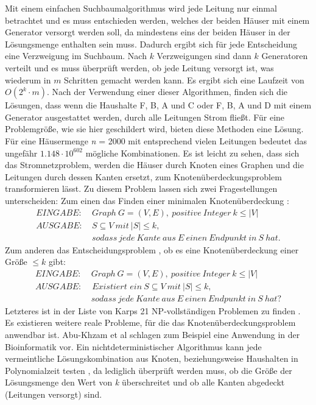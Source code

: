 Mit einem einfachen Suchbaumalgorithmus wird jede Leitung nur einmal betrachtet und es muss entschieden werden, welches der beiden Häuser mit einem Generator versorgt werden soll, da mindestens eins der beiden Häuser in der Lösungsmenge enthalten sein muss. Dadurch ergibt sich für jede Entscheidung eine Verzweigung im Suchbaum. Nach $k$ Verzweigungen sind dann $k$ Generatoren verteilt und es muss überprüft werden, ob jede Leitung versorgt ist, was wiederum in $m$ Schritten gemacht werden kann. Es ergibt sich eine Laufzeit von $O(2^{k} \cdot m)$. 
Nach der Verwendung einer dieser Algorithmen, finden sich die Lösungen, dass wenn die Haushalte F, B, A und C oder F, B, A und D mit einem Generator ausgestattet werden, durch alle Leitungen Strom fließt. Für eine Problemgröße, wie sie hier geschildert wird, bieten diese Methoden eine Lösung. Für eine Häusermenge \emph{n} = 2000 mit entsprechend vielen Leitungen bedeutet das ungefähr $1.148 \cdot 10^{602}$ mögliche Kombinationen.
Es ist leicht zu sehen, dass sich das Stromnetzproblem, werden die Häuser durch Knoten eines Graphen und die Leitungen durch dessen Kanten ersetzt, zum Knotenüberdeckungsproblem transformieren lässt. Zu diesem Problem lassen sich zwei Fragestellungen unterscheiden: Zum einen das Finden einer minimalen Knotenüberdeckung \cite{trees}:
\begin{align*}
EINGABE: &\ Graph\ G=(V,E),\ positive\ Integer\ k\leq |V|\\
AUSGABE: &\ S\subseteq V\ mit\ |S|\leq k,\\
&\ sodass\ jede\ Kante\ aus\ E\ einen\ Endpunkt\ in\ S\ hat.
\end{align*}
Zum anderen das Entscheidungsproblem \cite{exakt}, ob es eine Knotenüberdeckung einer Größe $\leq k$ gibt:
\begin{align*}
EINGABE: &\ Graph\ G=(V,E),\ positive\ Integer\ k\leq |V|\\
AUSGABE: &\textit{ Existiert ein}\ S\subseteq V\ mit\ |S|\leq k,\\
&\ sodass\ jede\ Kante\ aus\ E\ einen\ Endpunkt\ in\ S\ hat?
\end{align*}
Letzteres ist in der Liste von Karps 21 NP-vollständigen Problemen zu finden \cite{karp}.
Es existieren weitere reale Probleme, für die das Knotenüberdeckungsproblem anwendbar ist. Abu-Khzam et al \cite{paper:3} schlagen zum Beispiel eine Anwendung in der Bioinformatik vor.
Ein nichtdeterministischer Algorithmus kann jede vermeintliche Lösungskombination aus Knoten, beziehungsweise Haushalten in Polynomialzeit testen \cite{intract}, da lediglich überprüft werden muss, ob die Größe der Lösungsmenge den Wert von \emph{k} überschreitet und ob alle Kanten abgedeckt (Leitungen versorgt) sind.
